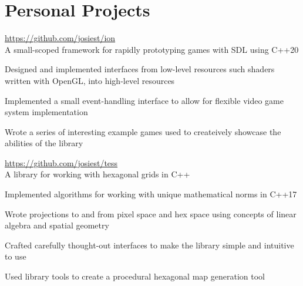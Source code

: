 \documentclass[10pt]{article}
\newenvironment{itemize*}
{\begin{itemize}[leftmargin=*]
    \setlength{\parskip}{0.5pt}}
{\end{itemize}}
\begin{document}
\section*{Personal Projects}
\begin{description}[leftmargin=!,labelwidth=\widthof{\bfseries ion library}]
\item[ion library] \url{https://github.com/josiest/ion}\\
    A small-scoped framework for rapidly prototyping games with SDL using C++20
\end{description}
\begin{itemize*}
\item Designed and implemented interfaces from low-level resources such shaders
      written with OpenGL, into high-level resources
\item Implemented a small event-handling interface to allow for flexible
      video game system implementation
\item Wrote a series of interesting example games used to createively showcase
      the abilities of the library
\vspace{10pt}
\end{itemize*}

\begin{description}[leftmargin=!,labelwidth=\widthof{\bfseries tess}]
\item[tess] \url{https://github.com/josiest/tess}\\
    A library for working with hexagonal grids in C++
\end{description}
\begin{itemize*}
\item Implemented algorithms for working with unique mathematical norms in C++17
\item Wrote projections to and from pixel space and hex space using concepts of
      linear algebra and spatial geometry
\item Crafted carefully thought-out interfaces to make the library simple and
      intuitive to use
\item Used library tools to create a procedural hexagonal map generation tool
\end{itemize*}
\end{document}
